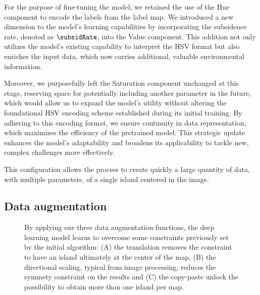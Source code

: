 For the purpose of fine-tuning the model, we retained the use of the Hue component to encode the labels from the label map. We introduced a new dimension to the model's learning capabilities by incorporating the subsidence rate, denoted as $\subsidRate$, into the Value component. This addition not only utilizes the model's existing capability to interpret the HSV format but also enriches the input data, which now carries additional, valuable environmental information.

Moreover, we purposefully left the Saturation component unchanged at this stage, reserving space for potentially including another parameter in the future, which would allow us to expand the model's utility without altering the foundational HSV encoding scheme established during its initial training. By adhering to this encoding format, we ensure continuity in data representation, which maximizes the efficiency of the pretrained model. This strategic update enhances the model's adaptability and broadens its applicability to tackle new, complex challenges more effectively.

This configuration allows the process to create quickly a large quantity of data, with multiple parameters, of a single island centered in the image. 

\subsection{Data augmentation}
\label{sec:coral-island_data-augmentation}

\begin{figure}[H]
    \caption{By applying our three data augmentation functions, the deep learning model learns to overcome some constraints previously set by the initial algorithm: (A) the translation removes the constraint to have an island ultimately at the center of the map, (B) the directional scaling, typical from image processing, reduces the symmety constraint on the results and (C) the copy-paste unlock the possibility to obtain more than one island per map.}
    \label{fig:coral-island_data-augmentation-examples}
\end{figure}

